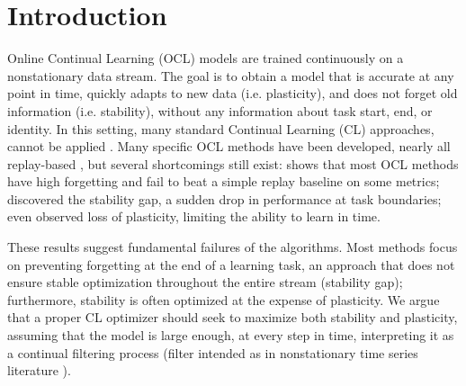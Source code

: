 \section{Introduction}
Online Continual Learning (OCL) models are trained continuously on a nonstationary data stream. The goal is to obtain a model that is accurate at any point in time, quickly adapts to new data (i.e. plasticity), and does not forget old information (i.e. stability), without any information about task start, end, or identity. In this setting, many standard Continual Learning (CL) approaches, cannot be applied \cite{aljundi2019task,mai2022online}. 
Many specific OCL methods have been developed, nearly all replay-based \cite{yoo2024layerwise}, but several shortcomings still exist: \cite{DBLP:conf/iccvw/Soutif-Cormerais23} shows that most OCL methods have high forgetting and fail to beat a simple replay baseline on some metrics; \cite{lirias4071238,DBLP:conf/iclr/CacciaAATPB22} discovered the stability gap, a sudden drop in performance at task boundaries; \cite{DBLP:journals/nature/DohareHLRMS24} even observed loss of plasticity, limiting the ability to learn in time.

These results suggest fundamental failures of the algorithms. Most methods focus on preventing forgetting at the end of a learning task, an approach that does not ensure stable optimization throughout the entire stream (stability gap); furthermore, stability is often optimized at the expense of plasticity. We argue that a proper CL optimizer should seek to maximize both stability and plasticity, assuming that the model is large enough, at every step in time, interpreting it as a continual filtering process (filter intended as in nonstationary time series literature \cite{durbin2012time}).

